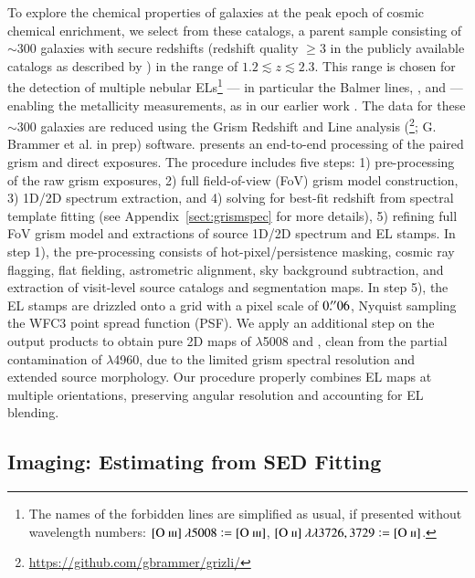 To explore the chemical properties of galaxies at the peak epoch of cosmic chemical enrichment, we select from these
catalogs, a parent sample consisting of $\sim$300 galaxies with secure redshifts (\ie redshift quality $\geq$3 in 
the publicly available catalogs as described by \citet{2015ApJ...812..114T}) in the range of $1.2\lesssim 
z\lesssim2.3$.
This range is chosen for the detection of multiple nebular ELs\footnote{The names of the forbidden lines are
simplified as usual, if presented without wavelength numbers: $[\textrm{O}~\textsc{iii}]~\lambda5008\vcentcolon=[\textrm{O}~\textsc{iii}]$,
$[\textrm{O}~\textsc{ii}]~\lambda\lambda3726,3729\vcentcolon=[\textrm{O}~\textsc{ii}]$.} --- in particular the Balmer lines, \OIII, and \OII --- enabling the metallicity 
measurements, as in our earlier work \citep{2015AJ....149..107J,Wang:2016um}.
The \glass data for these $\sim$300 galaxies are reduced using the Grism Redshift and Line analysis
(\grzl\footnote{\url{https://github.com/gbrammer/grizli/}}; G. Brammer et al. in prep) software.
\grzl presents an end-to-end processing of the paired grism and direct exposures. The procedure includes five steps: 1)
pre-processing of the raw grism exposures, 2) full field-of-view (FoV) grism model construction, 3) 1D/2D spectrum extraction, and
4) solving for best-fit redshift from spectral template fitting (see Appendix~\ref{sect:grismspec} for more 
details), 5) refining full FoV grism model and extractions of source 1D/2D spectrum and EL stamps.
In step 1), the pre-processing consists of hot-pixel/persistence masking, cosmic ray flagging, flat fielding, astrometric
alignment, sky background subtraction, and extraction of visit-level source catalogs and segmentation maps.
In step 5), the EL stamps are drizzled onto a grid with a pixel scale of $0\mbox{$.\!^{\prime\prime}$}06$, Nyquist sampling the WFC3 point spread
function (PSF).
We apply an additional step on the \grzl output products to obtain pure 2D maps of \OIII$\lambda$5008 and \Hb, clean from the
partial contamination of \OIII$\lambda$4960, due to the limited grism spectral resolution and extended source morphology.
Our procedure properly combines EL maps at multiple orientations, preserving angular resolution and accounting for EL
blending.

\subsection{\hst Imaging: Estimating \Mstar from SED Fitting}\label{subsect:imaging_data}

